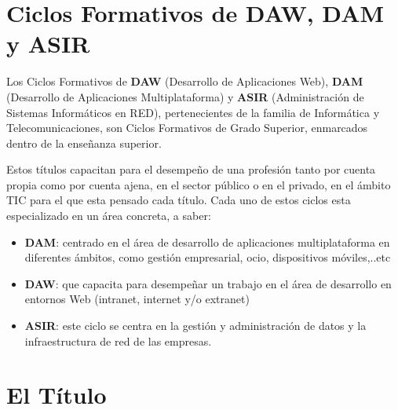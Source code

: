  \section{Ciclos Formativos de DAW, DAM y ASIR}
 Los Ciclos Formativos de {\bfseries DAW} (Desarrollo de Aplicaciones Web), {\bfseries DAM} (Desarrollo de Aplicaciones Multiplataforma) y {\bfseries ASIR} (Administración de Sistemas Informáticos en RED), pertenecientes de la familia de Informática y Telecomunicaciones, son Ciclos Formativos de Grado Superior, enmarcados dentro de la enseñanza superior.
 
 Estos títulos capacitan para el desempeño de una profesión tanto por cuenta propia como por cuenta ajena, en el sector público o en el privado, en el ámbito TIC para el que esta pensado cada título. Cada uno de estos ciclos esta especializado en un área concreta, a saber: 
 
 \begin{itemize}
 	\item {\bfseries DAM}: centrado en el área de desarrollo de aplicaciones multiplataforma en diferentes ámbitos, como gestión empresarial, ocio, dispositivos móviles,..etc
 	\item {\bfseries DAW}: que capacita para desempeñar un trabajo en el área de desarrollo en entornos Web (intranet, internet y/o extranet)
 	\item {\bfseries ASIR}: este ciclo se centra en la gestión y administración de datos y la infraestructura de red de las empresas.
 \end{itemize}
	
\section{El Título}



 

 
 
 
  
 

